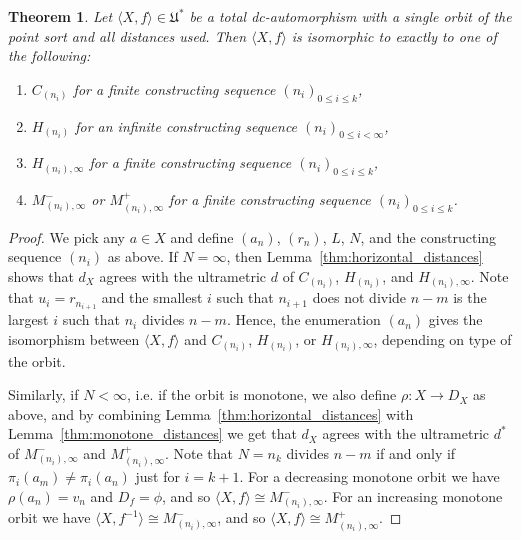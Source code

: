 \documentclass[oneside,notitlepage,12pt]{article}
\newtheorem{tw}{Theorem}[section]
\theoremstyle{definition}
\theoremstyle{remark}
\newcommand \seq [1]{\langle #1 \rangle}
\newcommand \maps {\colon} %
\newcommand \Ult {\mathfrak{U}}
\begin{document}
\begin{tw} \label{thm:single_orbit}
    Let $\seq{X, f} \in \Ult^*$ be a total dc-automorphism with a single orbit of the point sort and all distances used.
    Then $\seq{X, f}$ is isomorphic to exactly to one of the following:
    \begin{enumerate}
        \item $C_{(n_i)} $ for a finite constructing sequence $(n_i)_{0 \leq i \leq k}$,
        \item $H_{(n_i)} $ for an infinite constructing sequence $(n_i)_{0 \leq i < \infty}$,
        \item $H_{(n_i), \infty} $ for a finite constructing sequence $(n_i)_{0 \leq i \leq k}$,
        \item $M^-_{(n_i),\infty} $ or $M^+_{(n_i),\infty}$ for a finite constructing sequence $(n_i)_{0 \leq i \leq k}$.
    \end{enumerate}
\end{tw}
\begin{proof}
    We pick any $a \in X$ and define $(a_n)$, $(r_n)$, $L$, $N$, and the constructing sequence $(n_i)$ as above.
    If $N = \infty$, then Lemma~\ref{thm:horizontal_distances} shows that $d_X$ agrees with the ultrametric $d$ of $C_{(n_i)}$, $H_{(n_i)}$, and $H_{(n_i), \infty}$.
    Note that $u_i = r_{n_{i + 1}}$ and the smallest $i$ such that $n_{i + 1}$ does not divide $n - m$ is the largest $i$ such that $n_i$ divides $n - m$.
    Hence, the enumeration $(a_n)$ gives the isomorphism between $\seq{X, f}$ and $C_{(n_i)}$, $H_{(n_i)}$, or $H_{(n_i), \infty}$, depending on type of the orbit.

    Similarly, if $N < \infty$, i.e. if the orbit is monotone, we also define $\rho\maps X \to D_X$ as above, and by combining Lemma~\ref{thm:horizontal_distances} with Lemma~\ref{thm:monotone_distances} we get that $d_X$ agrees with the ultrametric $d^*$ of $M^-_{(n_i), \infty}$ and $M^+_{(n_i), \infty}$.
    Note that $N = n_k$ divides $n - m$ if and only if $\pi_i(a_m) \neq \pi_i(a_n)$ just for $i = k + 1$.
    For a decreasing monotone orbit we have $\rho(a_n) = v_n$ and $D_f = \phi$, and so $\seq{X, f} \cong M^-_{(n_i), \infty}$.
    For an increasing monotone orbit we have $\seq{X, f^{-1}} \cong M^-_{(n_i), \infty}$, and so $\seq{X, f} \cong M^+_{(n_i), \infty}$.
\end{proof}
\end{document}
